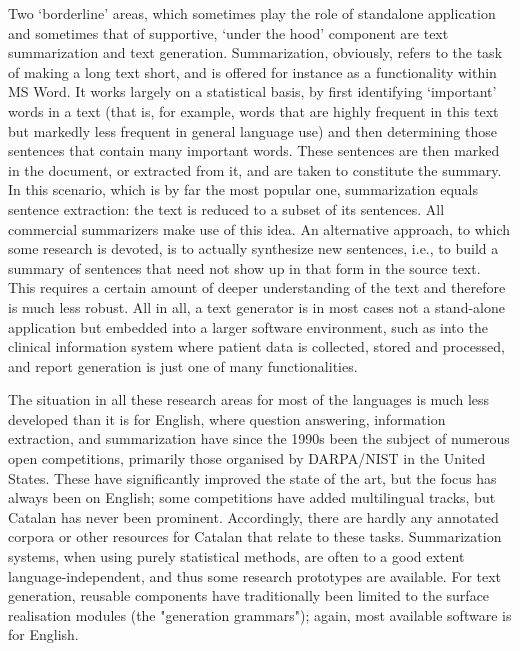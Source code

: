 \begin{multicols}{2}
Two ‘borderline’ areas, which sometimes play the role of standalone application and sometimes that of supportive, ‘under the hood’ component are text summarization and text generation. Summarization, obviously, refers to the task of making a long text short, and is offered for instance as a functionality within MS Word. It works largely on a statistical basis, by first identifying ‘important’ words in a text (that is, for example, words that are highly frequent in this text but markedly less frequent in general language use) and then determining those sentences that contain many important words. These sentences are then marked in the document, or extracted from it, and are taken to constitute the summary. In this scenario, which is by far the most popular one, summarization equals sentence extraction: the text is reduced to a subset of its sentences. All commercial summarizers make use of this idea. An alternative approach, to which some research is devoted, is to actually synthesize new sentences, i.e., to build a summary of sentences that need not show up in that form in the source text. This requires a certain amount of deeper understanding of the text and therefore is much less robust. All in all, a text generator is in most cases not a stand-alone application but embedded into a larger software environment, such as into the clinical information system where patient data is collected, stored and processed, and report generation is just one of many functionalities.


The situation in all these research areas for most of the languages is much less developed than it is for English, where question answering, information extraction, and summarization have since the 1990s been the subject of numerous open competitions, primarily those organised by DARPA/NIST in the United States. These have significantly improved the state of the art, but the focus has always been on English; some competitions have added multilingual tracks, but Catalan has never been prominent. Accordingly, there are hardly any annotated corpora or other resources for Catalan that relate to these tasks. Summarization systems, when using purely statistical methods, are often to a good extent language-independent, and thus some research prototypes are available. For text generation, reusable components have traditionally been limited to the surface realisation modules (the "generation grammars"); again, most available software is for English.


\end{multicols}

